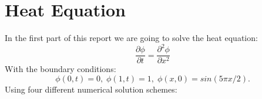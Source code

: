 \documentclass[ twoside,openright,titlepage,numbers=noenddot,headinclude,%
                footinclude=true,cleardoublepage=empty,abstractoff, %
                BCOR=5mm,paper=a4,fontsize=11pt,%
                ngerman,american,%
                ]{scrreprt}
\begin{document}
\frenchspacing
\raggedbottom
{} %
\pagestyle{plain}

%
\pagestyle{scrheadings}



\chapter{Heat Equation}
In the first part of this report we are going to solve the heat equation:
\begin{equation}
\frac{\partial \phi}{\partial t} = \frac{\partial^2 \phi}{\partial x^2} 
\end{equation} 
With the boundary conditions: 
\begin{equation*}
\phi(0,t) = 0, \; \phi(1,t) = 1, \; \phi(x,0) = sin(5\pi x /2).
\end{equation*}
Using four different numerical solution schemes:
\end{document}
